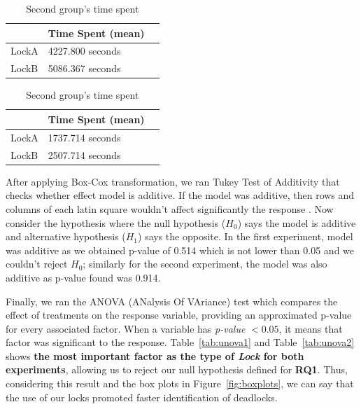 \begin{table}
\parbox{.45\linewidth}{
\centering
\begin{tabular}{|l|l|l|}
\hline
 & Time Spent (mean)\\
\hline
LockA & 4227.800 seconds \\
LockB & 5086.367 seconds \\
\hline
\end{tabular}
\caption{First group's time spent}\label{tab:mean1}
}
\hfill
\parbox{.45\linewidth}{
\centering
\begin{tabular}{|l|l|l|}
\hline
 & Time Spent (mean)\\
\hline
LockA & 1737.714 seconds \\
LockB & 2507.714 seconds \\
\hline
\end{tabular}
\caption{Second group's time spent}\label{tab:mean2}
}
\end{table}

After applying Box-Cox transformation, we ran Tukey Test of Additivity that checks whether effect model is additive. If the model was additive, then rows and columns of each latin square wouldn't affect significantly the response \cite{box}. Now consider the hypothesis where the null hypothesis ($H_{0}$) says the model is additive and alternative hypothesis ($H_{1}$) says the opposite. In the first experiment, model was additive as we obtained p-value of 0.514 which is not lower than 0.05 and we couldn't reject $H_{0}$; similarly for the second experiment, the model was also additive as p-value found was 0.914.

Finally, we ran the ANOVA (ANalysis Of VAriance) test which compares the effect of treatments on the response variable, providing an approximated p-value for every associated factor. When a variable has \emph{p-value} $< 0.05$, it means that factor was significant to the response. Table~\ref{tab:unova1} and Table~\ref{tab:unova2} shows \textbf{the most important factor as the type of \emph{Lock} for both experiments}, allowing us to reject our null hypothesis defined for {\bf RQ1}. Thus, considering this result and the box plots in Figure~\ref{fig:boxplots}, we can say that the use of our locks promoted faster identification of deadlocks.

